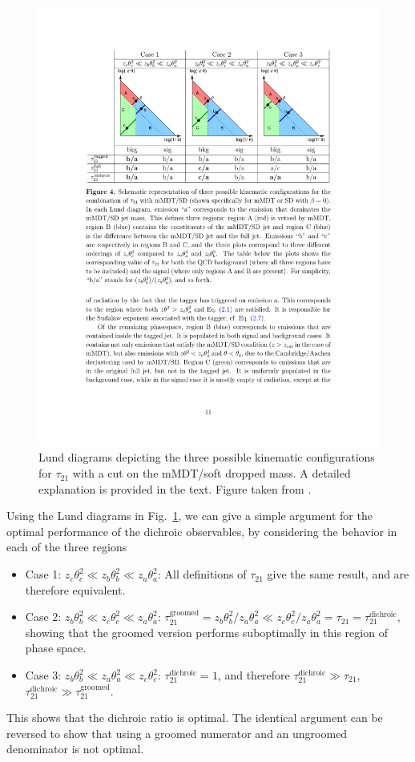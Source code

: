 \documentclass[11pt,letterpaper]{article}
\newcommand{\dichroic}{\text{dichroic}}
\newcommand{\groomed}{\text{groomed}}
\DeclareRobustCommand{\Fig}[1]{Fig.~\ref{#1}}
\begin{document}
\begin{figure}[t!]
\begin{center}
\includegraphics[width=0.75\columnwidth]{figures/dichroic_placeholder}
\end{center}
\caption{Lund diagrams depicting the three possible kinematic configurations for $\tau_{21}$ with a cut on the mMDT/soft dropped mass. A detailed explanation is provided in the text. Figure taken from \cite{Salam:2016yht}.}
\label{fig:dichroic}
\end{figure}




Using the Lund diagrams in \Fig{fig:dichroic}, we can give a simple argument for the optimal performance of the dichroic observables, by considering the behavior in each of the three regions
\begin{itemize}
\item Case 1: $z_c \theta_c^2 \ll z_b \theta_b^2 \ll z_a \theta_a^2$: All definitions of $\tau_{21}$ give the same result, and are therefore equivalent.
\item Case 2: $z_b\theta_b^2 \ll z_c \theta_c^2 \ll z_a \theta_a^2$: $\tau_{21}^\groomed=z_b \theta_b^2/z_a \theta_a^2 \ll  z_c \theta_c^2/z_a \theta_a^2=\tau_{21}=\tau_{21}^\dichroic$, showing that the groomed version performs suboptimally in this region of phase space.
\item Case 3: $z_b \theta_b^2 \ll z_a \theta_a^2 \ll z_c \theta_c^2$: $\tau_{21}^\dichroic=1$, and therefore $\tau_{21}^\dichroic \gg \tau_{21}$, $\tau_{21}^\dichroic \gg \tau_{21}^\groomed$. 
\end{itemize}
This shows that the dichroic ratio is optimal. The identical argument can be reversed to show that using a groomed numerator and an ungroomed denominator is not optimal.
\end{document}
